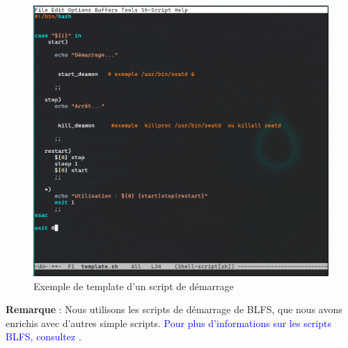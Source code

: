 \begin{figure}[H]  
  \centering  
  \includegraphics[width=1\textwidth]{images_pfe/systemvtemplate.png}  
  \caption{Exemple de template d’un script de démarrage} 
  \label{fig:systemvtemplate}  
\end{figure}  
\textbf{Remarque} : Nous utilisons les scripts de démarrage de BLFS, que nous avons enrichis avec d'autres simple scripts.  
\textcolor{blue}{Pour plus d'informations sur les scripts BLFS, consultez \cite{blfs_bootscripts}.}




      
